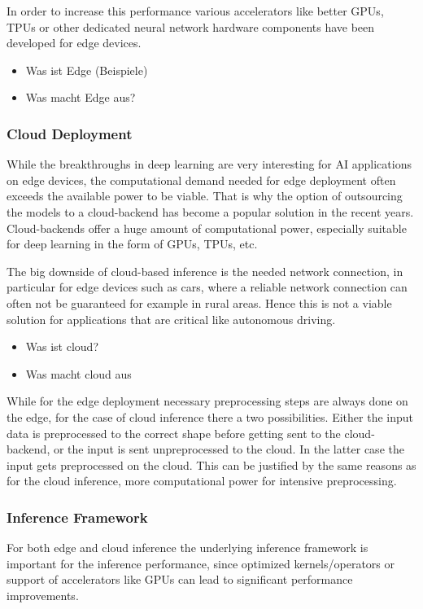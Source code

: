 In order to increase this performance various accelerators like better GPUs, TPUs or other dedicated neural network hardware components have been developed for edge devices.

\begin{itemize}
    \item Was ist Edge (Beispiele)
    \item Was macht Edge aus?
\end{itemize}
\subsubsection{Cloud Deployment}
While the breakthroughs in deep learning are very interesting for AI applications on edge devices, the computational demand needed for edge deployment often exceeds the available power to be viable.
That is why the option of outsourcing the models to a cloud-backend has become a popular solution in the recent years.
Cloud-backends offer a huge amount of computational power, especially suitable for deep learning in the form of GPUs, TPUs, etc.


The big downside of cloud-based inference is the needed network connection, in particular for edge devices such as cars, where a reliable network connection can often not be guaranteed for example in rural areas. Hence this is not a viable solution for applications that are critical like autonomous driving.
\begin{itemize}
    \item Was ist cloud?
    \item Was macht cloud aus
\end{itemize}
While for the edge deployment necessary preprocessing steps are always done on the edge, for the case of cloud inference there a two possibilities. Either the input data is preprocessed to the correct shape before getting sent to the cloud-backend, or the input is sent unpreprocessed to the cloud. 
In the latter case the input gets preprocessed on the cloud. 
This can be justified by the same reasons as for the cloud inference, more computational power for intensive preprocessing.
\subsubsection{Inference Framework}
For both edge and cloud inference the underlying inference framework is important for the inference performance, since optimized kernels/operators or support of accelerators like GPUs can lead to significant performance improvements.

